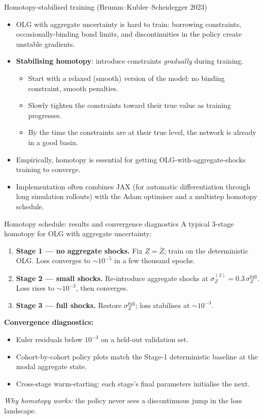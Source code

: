 \begin{frame}{Homotopy-stabilised training (Brumm--Kubler--Scheidegger 2023)}
\begin{itemize}
\item OLG with aggregate uncertainty is hard to train: borrowing constraints, occasionally-binding bond limits, and discontinuities in the policy create unstable gradients.
\medskip
\item \textbf{Stabilising homotopy}: introduce constraints \emph{gradually} during training.
  \begin{itemize}
  \item Start with a relaxed (smooth) version of the model: no binding constraint, smooth penalties.
  \item Slowly tighten the constraints toward their true value as training progresses.
  \item By the time the constraints are at their true level, the network is already in a good basin.
  \end{itemize}
\medskip
\item Empirically, homotopy is essential for getting OLG-with-aggregate-shocks training to converge.
\medskip
\item Implementation often combines JAX (for automatic differentiation through long simulation rollouts) with the Adam optimiser and a multistep homotopy schedule.
\end{itemize}
\end{frame}

\begin{frame}{Homotopy schedule: results and convergence diagnostics}
A typical 3-stage homotopy for OLG with aggregate uncertainty:
\medskip
\begin{enumerate}
\item \textbf{Stage 1 --- no aggregate shocks.} Fix $Z = \bar Z$; train on the deterministic OLG. Loss converges to $\sim 10^{-5}$ in a few thousand epochs.
\item \textbf{Stage 2 --- small shocks.} Re-introduce aggregate shocks at $\sigma_Z^{(2)} = 0.3\,\sigma_Z^{\text{full}}$. Loss rises to $\sim 10^{-3}$, then converges.
\item \textbf{Stage 3 --- full shocks.} Restore $\sigma_Z^{\text{full}}$; loss stabilises at $\sim 10^{-3}$.
\end{enumerate}
\medskip
\textbf{Convergence diagnostics:}
\begin{itemize}
\item Euler residuals below $10^{-3}$ on a held-out validation set.
\item Cohort-by-cohort policy plots match the Stage-1 deterministic baseline at the modal aggregate state.
\item Cross-stage warm-starting: each stage's final parameters initialise the next.
\end{itemize}
\textit{Why homotopy works:} the policy never sees a discontinuous jump in the loss landscape.
\end{frame}

